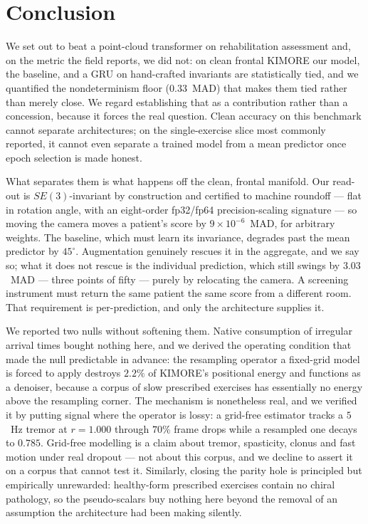 \documentclass[10pt,journal]{IEEEtran}
\begin{document}
\section{Conclusion}
\label{sec:conclusion}

We set out to beat a point-cloud transformer on rehabilitation assessment and, on the metric the field reports, we did not: on clean frontal KIMORE our model, the baseline, and a GRU on hand-crafted invariants are statistically tied, and we quantified the nondeterminism floor ($0.33$~MAD) that makes them tied rather than merely close. We regard establishing that as a contribution rather than a concession, because it forces the real question. Clean accuracy on this benchmark cannot separate architectures; on the single-exercise slice most commonly reported, it cannot even separate a trained model from a mean predictor once epoch selection is made honest.

What separates them is what happens off the clean, frontal manifold. Our read-out is $SE(3)$-invariant by construction and certified to machine roundoff --- flat in rotation angle, with an eight-order fp32/fp64 precision-scaling signature --- so moving the camera moves a patient's score by $9\times10^{-6}$~MAD, for arbitrary weights. The baseline, which must learn its invariance, degrades past the mean predictor by $45^\circ$. Augmentation genuinely rescues it in the aggregate, and we say so; what it does not rescue is the individual prediction, which still swings by $3.03$~MAD --- three points of fifty --- purely by relocating the camera. A screening instrument must return the same patient the same score from a different room. That requirement is per-prediction, and only the architecture supplies it.

We reported two nulls without softening them. Native consumption of irregular arrival times bought nothing here, and we derived the operating condition that made the null predictable in advance: the resampling operator a fixed-grid model is forced to apply destroys $2.2\%$ of KIMORE's positional energy and functions as a denoiser, because a corpus of slow prescribed exercises has essentially no energy above the resampling corner. The mechanism is nonetheless real, and we verified it by putting signal where the operator is lossy: a grid-free estimator tracks a $5$~Hz tremor at $r=1.000$ through $70\%$ frame drops while a resampled one decays to $0.785$. Grid-free modelling is a claim about tremor, spasticity, clonus and fast motion under real dropout --- not about this corpus, and we decline to assert it on a corpus that cannot test it. Similarly, closing the parity hole is principled but empirically unrewarded: healthy-form prescribed exercises contain no chiral pathology, so the pseudo-scalars buy nothing here beyond the removal of an assumption the architecture had been making silently.
\end{document}
